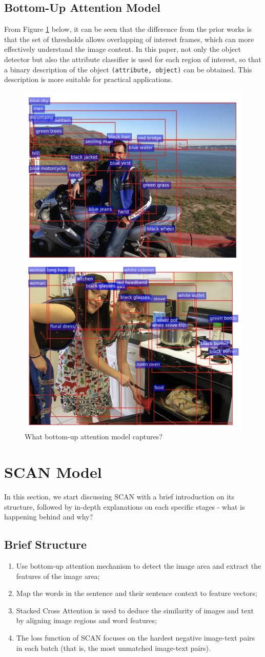 \subsection{Bottom-Up Attention Model}

From Figure \ref{fig:bottomup} below, it can be seen that the difference from the prior works is that the set of thresholds allows overlapping of interest frames, which can more effectively understand the image content. In this paper, not only the object detector but also the attribute classifier is used for each region of interest, so that a binary description of the object \verb|(attribute, object)| can be obtained. This description is more suitable for practical applications.

\begin{figure}[h!]
\centering
\includegraphics[width=.35\textwidth]{bottomup.pdf}
\caption{What bottom-up attention model captures? \cite{bottomup}}
\label{fig:bottomup}
\end{figure}

\section{SCAN Model}
In this section, we start discussing SCAN with a brief introduction on its structure, followed by in-depth explanations on each specific stages - what is happening behind and why?

\subsection{Brief Structure}
\begin{enumerate}
    \item Use bottom-up attention mechanism \cite{bottomup} to detect the image area and extract the features of the image area;
    \item Map the words in the sentence and their sentence context to feature vectors;
    \item Stacked Cross Attention is used to deduce the similarity of images and text by aligning image regions and word features;
    \item The loss function of SCAN focuses on the hardest negative image-text pairs in each batch (that is, the most unmatched image-text pairs).
\end{enumerate}

